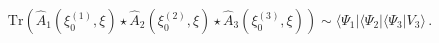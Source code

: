 \begin{equation}
\mathrm{Tr}(\hat{A}_1(\xi _{0}^{(1)},\xi )\star \hat{A}_2(\xi
_{0}^{(2)},\xi )\star \hat{A}_3(\xi _{0}^{(3)},\xi ))\sim \langle
\Psi_1|\langle \Psi_2|\langle \Psi_3|V_{3}\rangle\,.
\end{equation}

